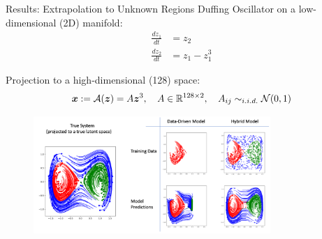 \documentclass[8pt]{beamer}
\begin{document}
\begin{frame}{Results: Extrapolation to Unknown Regions}
Duffing Oscillator on a low-dimensional (2D) manifold:
\begin{equation}
    \label{eq:duffing_definition}
    \begin{split}
    \frac{dz_1}{dt} & = z_2 \\ 
    \frac{dz_2}{dt} & = z_1 - z_1^3
    \end{split}
\end{equation}

Projection to a high-dimensional (128) space:
\begin{equation}
    \label{eq:duffing_true_decoder}
    \boldsymbol{x} := \mathcal{A}(\boldsymbol{z}) = A\boldsymbol{z}^3, \quad A \in \mathbb{R}^{128 \times 2}, \quad A_{ij} \sim_{i.i.d.} \mathcal{N}(0, 1)
\end{equation}

\begin{figure}
	\centering
	\includegraphics[width=0.8\textwidth]{Figures/duff_results.png}
\end{figure}

\end{frame}
\end{document}
